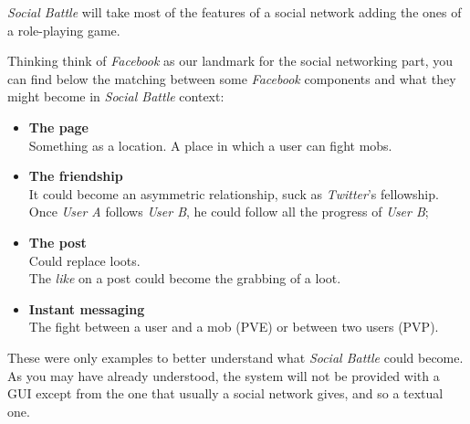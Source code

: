 		\noindent \textit{Social Battle} will take most of the features of a social network adding the 
		ones of a role-playing game.

		\noindent Thinking think of \textit{Facebook} as our landmark for the social networking part, 
		you can find below the matching between some \textit{Facebook} components and what 
		they might become in \textit{Social Battle} context:
		\begin{itemize}
			\item \textbf{The page}\\
			Something as a location. A place in which a user can fight mobs.

			\item \textbf{The friendship}\\
			It could become an asymmetric relationship, suck as \textit{Twitter}'s fellowship.
			Once \textit{User A} follows \textit{User B}, he could follow all the progress
			of \textit{User B};

			\item \textbf{The post}\\
			Could replace loots.\\
			The \textit{like} on a post could become the grabbing of a loot.

			\item \textbf{Instant messaging}\\
			The fight between a user and a mob (PVE) or between two users (PVP).
		\end{itemize}

		\noindent These were only examples to better understand what \textit{Social Battle} could become.\\
		As you may have already understood, the system will not be provided with a GUI except from the one 
		that usually a social network gives, and so a textual one.

